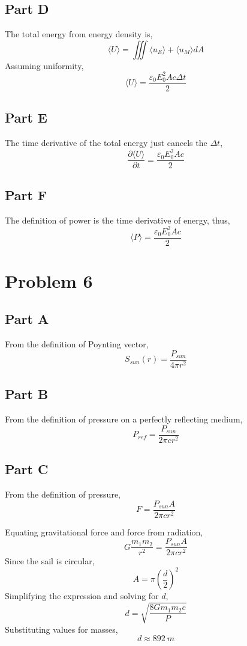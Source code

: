\documentclass{article}
\begin{document}
\subsection*{Part D}

The total energy from energy density is,
$$ \langle U \rangle = \iiint \langle u_E \rangle + \langle u_M \rangle dA $$
Assuming uniformity,
$$ \langle U \rangle = \frac{\varepsilon_0 E_0^2 A c \Delta t}{2} $$

\subsection*{Part E}

The time derivative of the total energy just cancels the $\Delta t$,
$$ \frac{\partial\langle U \rangle}{\partial t} = \frac{\varepsilon_0 E_0^2 A c
}{2} $$

\subsection*{Part F}

The definition of power is the time derivative of energy, thus,
$$ \langle P \rangle = \frac{\varepsilon_0 E_0^2 A c }{2} $$

\section*{Problem 6}

\subsection*{Part A}

From the definition of Poynting vector,
$$ S_{sun}(r) = \frac{P_{sun}}{4 \pi r^2} $$

\subsection*{Part B}

From the definition of pressure on a perfectly reflecting medium,
$$ P_{ref} = \frac{P_{sun}}{2 \pi c r^2} $$

\subsection*{Part C}

From the definition of pressure,
$$ F = \frac{P_{sun} A}{2 \pi c r^2} $$

Equating gravitational force and force from radiation,
$$ G \frac{m_1 m_2}{r^2} = \frac{P_{sun} A}{2 \pi c r^2} $$
Since the sail is circular,
$$ A = \pi \left(\frac{d}{2}\right)^2 $$
Simplifying the expression and solving for $d$,
$$ d = \sqrt{\frac{8 G m_1 m_2 c}{P}} $$
Substituting values for masses,
$$ d \approx 892\ \si{m} $$
\end{document}
